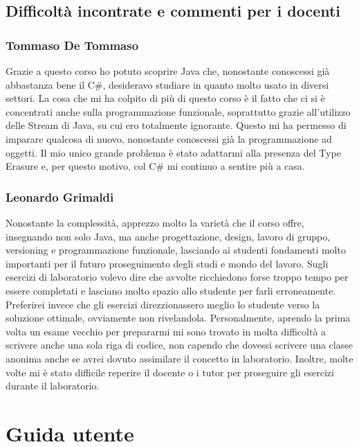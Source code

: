 \documentclass[a4paper,12pt]{report}
\begin{document}
\section{Difficoltà incontrate e commenti per i docenti}
\subsection*{Tommaso De Tommaso}
Grazie a questo corso ho potuto scoprire Java che, nonostante conoscessi già abbastanza bene il C\#, desideravo studiare in quanto molto usato in diversi settori.
%
La cosa che mi ha colpito di più di questo corso è il fatto che ci si è concentrati anche sulla programmazione funzionale, soprattutto grazie all'utilizzo delle Stream di Java, su cui ero totalmente ignorante.
%
Questo mi ha permesso di imparare qualcosa di nuovo, nonostante conoscessi già la programmazione ad oggetti.
%
Il mio unico grande problema è stato adattarmi alla presenza del Type Erasure e, per questo motivo, col C\# mi continuo a sentire più a casa.

\subsection*{Leonardo Grimaldi}

Nonostante la complessità, apprezzo molto la varietà che il corso offre, insegnando non solo Java, ma anche progettazione, design, lavoro di gruppo, versioning e programmazione funzionale, lasciando ai studenti fondamenti molto importanti per il futuro proseguimento degli studi e mondo del lavoro.
%
Sugli esercizi di laboratorio volevo dire che avvolte ricchiedono forse troppo tempo per essere completati e lasciano molto spazio allo studente per farli erroneamente.
%
Preferirei invece che gli esercizi direzzionassero meglio lo studente verso la soluzione ottimale, ovviamente non rivelandola.
%
Personalmente, aprendo la prima volta un esame vecchio per prepararmi mi sono trovato in molta difficoltà a scrivere anche una sola riga di codice, non capendo che dovessi scrivere una classe anonima anche se avrei dovuto assimilare il concetto in laboratorio.
%
Inoltre, molte volte mi è stato difficile reperire il docente o i tutor per proseguire gli esercizi durante il laboratorio.
%

\appendix
\chapter{Guida utente}
\end{document}
